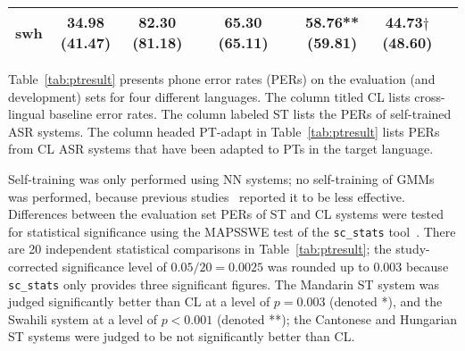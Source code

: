 \begin{table*}[t]
{\begin{tabular}{| c || c | c c | c c | c | c c |}
    \\
    swh & 34.98 (41.47)
    & 82.30 (81.18) &
    & 65.30 (65.11) &
    & 58.76** (59.81)
    &   \textbf{44.73$\dagger$ (48.60)} &
    \\\hline
\end{tabular}}
\vspace*{1mm}
\caption{\label{tab:ptresult} PERs on the evaluation and development sets (development in parentheses) before and after adaptation with PTs.  ML=Maximum Likelihood, sMBR=Structural Minimum Bayes Risk.  MAPSSWE significance testing with respect to CL acoustic model with text-based language model: * means $p\le 0.003$, ** means $p<0.001$, ns means not significant. $\dagger$ denotes a score lower than both CL and ST baselines at $p<0.001$.}
\end{table*}


Table~\ref{tab:ptresult} presents phone error rates (PERs) on the
evaluation (and development) sets for four different languages. The
column titled {\sc CL} lists cross-lingual baseline error rates.
The column labeled {\sc ST} lists the
PERs of self-trained ASR systems.
The column headed {\sc PT-adapt} in Table~\ref{tab:ptresult} lists
PERs from {\sc CL} ASR systems that have been adapted to PTs in the target
language.

Self-training was only performed
using NN systems; no self-training of GMMs was performed, because
previous studies~\cite{Huang2013} reported it to be less effective.
Differences between the evaluation set PERs of {\sc ST} and {\sc CL}
systems were tested for statistical significance using the MAPSSWE
test of the {\tt sc\_stats} tool~\cite{Pallet90}.  There are 20
independent statistical comparisons in Table~\ref{tab:ptresult}; the
study-corrected significance level of $0.05/20=0.0025$ was rounded up
to $0.003$ because {\tt sc\_stats} only provides three significant
figures.  The Mandarin {\sc ST} system was judged significantly better
than {\sc CL} at a level of $p=0.003$ (denoted *), and the Swahili
system at a level of $p<0.001$ (denoted **); the Cantonese and
Hungarian {\sc ST} systems were judged to be not significantly better
than {\sc CL}.

